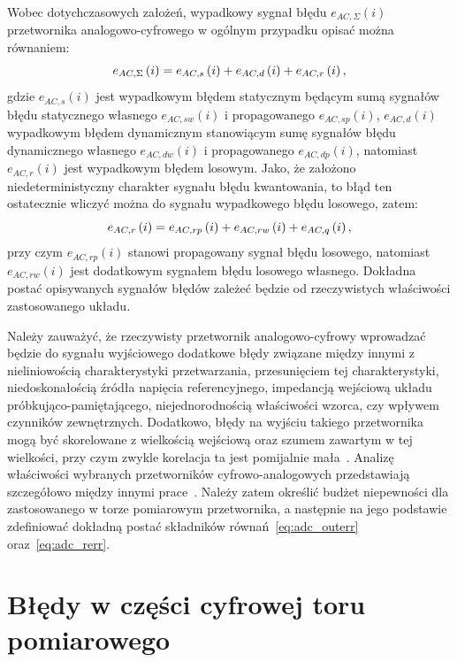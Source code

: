 Wobec dotychczasowych założeń, wypadkowy sygnał błędu $e_{AC,\Sigma}(i)$ przetwornika analogowo-cyfrowego w ogólnym przypadku opisać można równaniem:
\begin{equation}
e_{AC,\Sigma} \left(i\right) = e_{AC,s} \left(i\right) + e_{AC,d} \left(i\right) + e_{AC,r} \left(i\right) \label{eq:adc_outerr},
\end{equation}
gdzie $e_{AC,s}(i)$ jest wypadkowym błędem statycznym będącym sumą sygnałów błędu statycznego własnego $e_{AC,sw}(i)$ i propagowanego $e_{AC,sp}(i)$, $e_{AC,d}(i)$ wypadkowym błędem dynamicznym stanowiącym sumę sygnałów błędu dynamicznego własnego $e_{AC,dw}(i)$ i propagowanego $e_{AC,dp}(i)$, natomiast $e_{AC,r}(i)$ jest wypadkowym błędem losowym. Jako, że założono niedeterministyczny charakter sygnału błędu kwantowania, to błąd ten ostatecznie wliczyć można do sygnału wypadkowego błędu losowego, zatem:
\begin{equation}
e_{AC,r} \left(i\right) = e_{AC,rp} \left(i\right) + e_{AC,rw} \left(i\right) + e_{AC,q} \left(i\right) \label{eq:adc_rerr},
\end{equation}
przy czym $e_{AC,rp}(i)$ stanowi propagowany sygnał błędu losowego, natomiast $e_{AC,rw}(i)$ jest dodatkowym sygnałem błędu losowego własnego. Dokładna postać opisywanych sygnałów błędów zależeć będzie od rzeczywistych właściwości zastosowanego układu.

Należy zauważyć, że rzeczywisty przetwornik analogowo-cyfrowy wprowadzać będzie do sygnału wyjściowego dodatkowe błędy związane między innymi z nieliniowością charakterystyki przetwarzania, przesunięciem tej charakterystyki, niedoskonałością źródła napięcia referencyjnego, impedancją wejściową układu próbkująco-pamiętającego, niejednorodnością właściwości wzorca, czy wpływem czynników zewnętrznych. Dodatkowo, błędy na wyjściu takiego przetwornika mogą być skorelowane z wielkością wejściową oraz szumem zawartym w tej wielkości, przy czym zwykle korelacja ta jest pomijalnie mała~\cite{sienkowski_adc}. Analizę właściwości wybranych przetworników cyfrowo-analogowych przedstawiają szczegółowo między innymi prace~\cite{jakubiec_system, sienkowski_adc, sienkowski_kwant, arpaia_deltasigma}. Należy zatem określić budżet niepewności dla zastosowanego w torze pomiarowym przetwornika, a następnie na jego podstawie zdefiniować dokładną postać składników równań~\eqref{eq:adc_outerr} oraz~\eqref{eq:adc_rerr}.

\section{Błędy w części cyfrowej toru pomiarowego}


